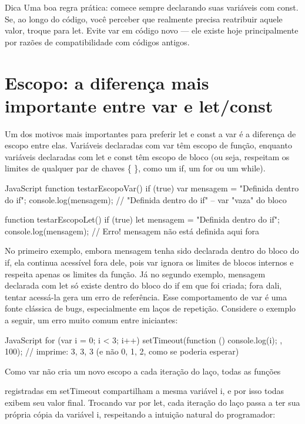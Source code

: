 \begin{infobox}{Dica}
Uma boa regra prática: comece sempre declarando suas variáveis com const. Se, ao longo do código, você perceber que realmente precisa reatribuir aquele valor, troque para let. Evite var em código novo — ele existe hoje principalmente por razões de compatibilidade com códigos antigos.
\end{infobox}

\section{Escopo: a diferença mais importante entre var e let/const}

Um dos motivos mais importantes para preferir let e const a var é a diferença de escopo entre elas. Variáveis declaradas com var têm escopo de função, enquanto variáveis declaradas com let e const têm escopo de bloco (ou seja, respeitam os limites de qualquer par de chaves \{ \}, como um if, um for ou um while).

\begin{codebox}{JavaScript}
function testarEscopoVar() {
  if (true) {
    var mensagem = "Definida dentro do if";
  }
  console.log(mensagem); // "Definida dentro do if" -- var "vaza" do bloco
}

function testarEscopoLet() {
  if (true) {
    let mensagem = "Definida dentro do if";
  }
  console.log(mensagem); // Erro! mensagem não está definida aqui fora
}
\end{codebox}

No primeiro exemplo, embora mensagem tenha sido declarada dentro do bloco do if, ela continua acessível fora dele, pois var ignora os limites de blocos internos e respeita apenas os limites da função. Já no segundo exemplo, mensagem declarada com let só existe dentro do bloco do if em que foi criada; fora dali, tentar acessá-la gera um erro de referência. Esse comportamento de var é uma fonte clássica de bugs, especialmente em laços de repetição. Considere o exemplo a seguir, um erro muito comum entre iniciantes:

\begin{codebox}{JavaScript}
for (var i = 0; i < 3; i++) {
  setTimeout(function () {
    console.log(i);
  }, 100);
}
// imprime: 3, 3, 3 (e não 0, 1, 2, como se poderia esperar)

   Como var não cria um novo escopo a cada iteração do laço, todas as funções
\end{codebox}

registradas em setTimeout compartilham a mesma variável i, e por isso todas exibem seu valor final. Trocando var por let, cada iteração do laço passa a ter sua própria cópia da variável i, respeitando a intuição natural do programador:

